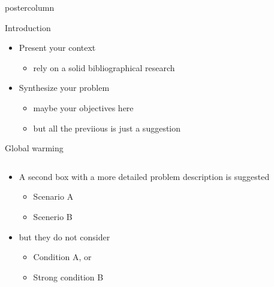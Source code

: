 \documentclass[final,hyperref={pdfpagelabels=false}]{beamer}
\begin{document}
\begin{frame}
\begin{columns}
\begin{column}{.49\textwidth}
\begin{beamercolorbox}[center,wd=\textwidth]{postercolumn}
\begin{minipage}[T]{.95\textwidth}
{            \vfill

            \begin{block}{Introduction}
              \begin{itemize}
              \item Present your context
                \begin{itemize}
                \item rely on a solid bibliographical research
                \end{itemize}
              \item Synthesize your problem
                \begin{itemize}
                \item maybe your objectives here
                \item but all the previious is just a suggestion
                \end{itemize}
              \end{itemize}              
            \end{block}
            \vfill
            \begin{block}{Global warming}
              \begin{columns}
                \begin{column}{.65\textwidth}
                  \begin{itemize}
                  \item A second box with a more detailed problem description
                    is suggested
                    \begin{itemize}
                    \item Scenario A
                    \item Scenerio B
                    \end{itemize}
                  \item but they do not consider
                    \begin{itemize}
                    \item Condition A, or
                    \item \alert{Strong} condition B
                    \end{itemize}
                  \end{itemize}
                \end{column}
                \begin{column}{.34\textwidth}
                  \centering

\end{column}
\end{columns}
\end{block}}
\end{minipage}
\end{beamercolorbox}
\end{column}
\end{columns}
\end{frame}
\end{document}

